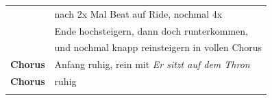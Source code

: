 \begin{tabular}{p{1.6cm}l}
                    & nach 2x Mal Beat auf Ride, nochmal 4x           \\
                    & Ende hochsteigern, dann doch runterkommen,      \\
                    & und nochmal knapp reinsteigern in vollen Chorus \\
    \textbf{Chorus} & Anfang ruhig, rein mit \textit{Er sitzt auf dem Thron} \\  %
    \textbf{Chorus} & ruhig                                           \\
                    &                                                 \\
\end{tabular}
